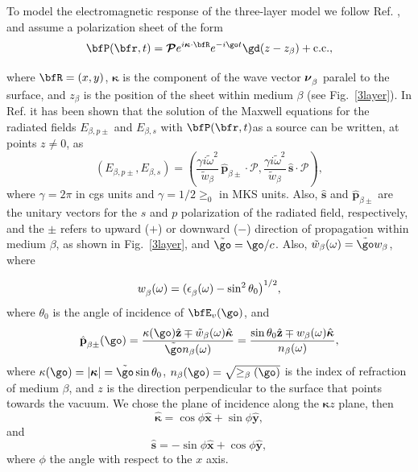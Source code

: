 To model the electromagnetic response of the three-layer model 
we follow Ref. \cite{mizrahiJOSA88},
and assume a polarization sheet of the form
\begin{align}\label{m31}
\bfP(\bfr,t)=\boldsymbol{\mathcal{P}}
e^{i\boldsymbol{\kappa}\cdot\bfR}e^{-i\go t}\gd(z-z_\beta)+\mathrm{c.c.}
,
\end{align}
where $\bfR=(x,y)$, $\boldsymbol{\kappa}$ 
is the component of the wave
vector $\boldsymbol{\nu}^{\strut}_\beta$ paralel to the surface, and
$z_\beta$ is the position of the sheet within
medium $\beta$ (see Fig.~\ref{3layer}).
In Ref. \cite{sipeJOSAB87} it has been shown 
that the solution of the Maxwell equations for the radiated fields 
$E_{\beta,p\pm}$ and $E_{\beta,s}$
with $\bfP(\bfr,t)$as a source can be written, at points
$z\neq 0$, as 
\begin{equation}\label{r2}
(E_{\beta,p\pm},E_{\beta,s}) = 
(\frac{\gamma i\tilde\omega^2}{\tilde w_\beta}
\,\hat{\mathbf{p}}_{\beta\pm}\cdot\boldsymbol{\mathcal{P}},
\frac{\gamma i\tilde\omega^2}{\tilde w_\beta}
\,\hat{\mathbf{s}}\cdot\boldsymbol{\mathcal{P}}),
\end{equation} 
where $\gamma=2\pi$ in cgs units and $\gamma=1/2\ge_0$ in MKS units.
Also,
$\hat{\mathbf{s}}$ and $\hat{\mathbf{p}}_{\beta\pm}$ are the unitary vectors for
the $s$ and $p$ polarization of the radiated field, 
respectively, and the $\pm$ refers to upward ($+$) or
downward ($-$) direction of propagation within medium $\beta$, as shown in
Fig.~\ref{3layer}, and $\tilde\go=\go/c$.
Also, $\tilde w_\beta(\omega)=\tilde\go w_\beta$, where
\begin{equation}\label{r3}
w^{\strut}_\beta(\omega)=(\epsilon^{\strut}_\beta(\omega) - \sin^2\theta_0\big)^{1/2},
\end{equation}
where $\theta_0$ is the angle of incidence of $\bfE_v(\go)$, 
and
\begin{equation}\label{r4}
\hat{\mathbf{p}}^{\strut}_{\beta\pm}(\go) =
\frac{\kappa(\go)\hat{\mathbf{z}}\mp \tilde 
  w_\beta(\omega)\hat{\boldsymbol{\kappa}}} 
{\tilde\go n_\beta(\omega)}
=
\frac{\sin\theta_0\hat{\mathbf{z}}\mp 
  w_\beta(\omega)\hat{\boldsymbol{\kappa}}} 
{n_\beta(\omega)}
,
\end{equation}
where $\kappa(\go)=|\boldsymbol{\kappa}|=\tilde\go\sin\theta_0$,
$n_\beta(\go)=\sqrt{\ge_\beta(\go)}$ is
the index of refraction of medium $\beta$, and
$z$ is the direction perpendicular to the surface that 
points towards the vacuum.
We chose the plane of incidence along the  
$\boldsymbol{\kappa}z$ plane, then 
\begin{equation}\label{mc1}
\hat{\boldsymbol{\kappa}}
= \cos\phi\hat{\mathbf{x}} + \sin\phi\hat{\mathbf{y}},
\end{equation}
and
\begin{equation}\label{mmc2}
\hat{\mathbf{s}} = -\sin\phi\hat{\mathbf{x}} + \cos\phi\hat{\mathbf{y}},
\end{equation}
where
$\phi$ the angle with respect to the $x$ axis.

